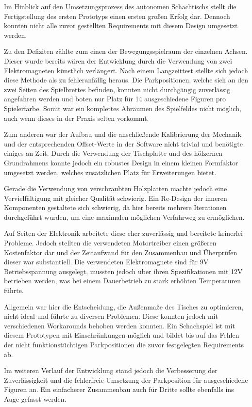 Im Hinblick auf den Umsetzungsprozess des autonomen Schachtischs stellt
die Fertigstellung des ersten Prototyps einen ersten großen Erfolg dar.
Dennoch konnten nicht alle zuvor gestellten Requirements mit diesem
Design umgesetzt werden.

Zu den Defiziten zählte zum einen der Bewegungsspielraum der einzelnen
Achsen. Dieser wurde bereits wären der Entwicklung durch die Verwendung
von zwei Elektromagneten künstlich verlängert. Nach einem Langzeittest
stellte sich jedoch diese Methode als zu fehleranfällig heraus. Die
Parkpositionen, welche sich an den zwei Seiten des Spielbrettes
befinden, konnten nicht durchgängig zuverlässig angefahren werden und
boten nur Platz für 14 ausgeschiedene Figuren pro Spielerfarbe. Somit
war ein komplettes Abräumen des Spielfeldes nicht möglich, auch wenn
dieses in der Praxis selten vorkommt.

Zum anderen war der Aufbau und die anschließende Kalibrierung der
Mechanik und der entsprechenden Offset-Werte in der Software nicht
trivial und benötigte einiges an Zeit. Durch die Verwendung der
Tischplatte und des hölzernen Grundrahmens konnte jedoch ein robustes
Design in einem kleinen Formfaktor umgesetzt werden, welches
zusätzlichen Platz für Erweiterungen bietet.

Gerade die Verwendung von verschraubten Holzplatten machte jedoch eine
Vervielfältigung mit gleicher Qualität schwierig. Ein Re-Design der
inneren Komponenten gestaltete sich schwierig, da hier bereits mehrere
Iterationen durchgeführt wurden, um eine maximalen möglichen Verfahrweg
zu ermöglichen.

Auf Seiten der Elektronik arbeitete diese eher zuverlässig und bereitete
keinerlei Probleme. Jedoch stellten die verwendeten Motortreiber einen
größeren Kostenfaktor dar und der Zeitaufwand für den Zusammenbau und
Überprüfen dieser war substantiell. Die verwendeten Elektromagnete sind
für 9V Betriebsspannung ausgelegt, mussten jedoch über ihren
Spezifikationen mit 12V betrieben werden, was bei einem Dauerbetrieb zu
stark erhöhten Temperaturen führte.

Allgemein war hier die Entscheidung, die Außenmaße des Tisches zu
optimieren, nicht ideal und führte zu diversen Problemen. Diese konnten
jedoch mit verschiedenen Workarounds behoben werden konnten. Ein
Schachspiel ist mit diesem Prototypen mit Einschränkungen möglich und
bildet bis auf das Fehlen der nicht funktionstüchtigen Parkpositionen
die zuvor festgelegten Requirements ab.

Im weiteren Verlauf der Entwicklung stand jedoch die Verbesserung der
Zuverlässigkeit und die fehlerfreie Umsetzung der Parkposition für
ausgeschiedene Figuren an. Ein einfacherer Zusammenbau auch für Dritte
sollte ebenfalls ins Auge gefasst werden.

